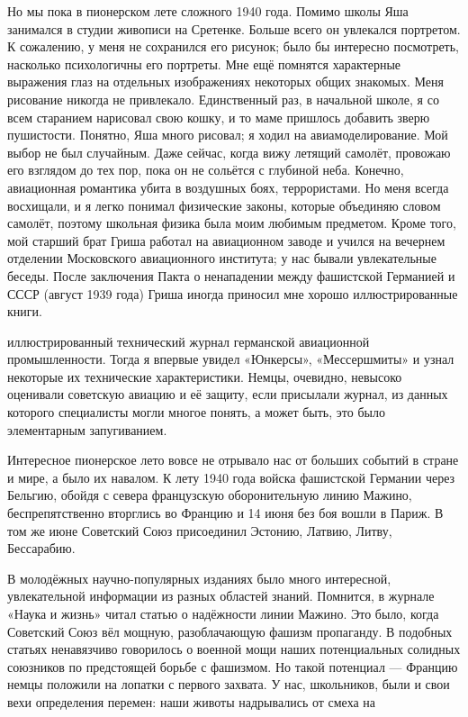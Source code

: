 \label{20-1}
Но мы пока в пионерском лете сложного 1940 года. Помимо школы Яша занимался в студии живописи на Сретенке. Больше всего он увлекался портретом. К сожалению, у меня не сохранился его рисунок; было бы интересно посмотреть, насколько психологичны его портреты. Мне ещё помнятся характерные выражения глаз на отдельных изображениях некоторых общих знакомых. Меня рисование никогда не привлекало. Единственный раз, в начальной школе, я со всем старанием нарисовал свою кошку, и то маме пришлось добавить зверю пушистости. Понятно, Яша много рисовал; я ходил на авиамоделирование. Мой выбор не был случайным. Даже сейчас, когда вижу летящий самолёт, провожаю его взглядом до тех пор, пока он не сольётся с глубиной неба. Конечно, авиационная романтика убита в воздушных боях, террористами. Но меня всегда восхищали, и я легко понимал физические законы, которые объединяю словом самолёт, поэтому школьная физика была моим любимым предметом. Кроме того, мой старший брат Гриша работал на авиационном заводе и учился на вечернем отделении Московского авиационного института; у нас бывали увлекательные беседы. После заключения Пакта о ненападении между фашистской Германией и СССР (август 1939 года) Гриша иногда приносил мне хорошо иллюстрированные книги.

\label{21-1}
иллюстрированный технический журнал германской авиационной промышленности. Тогда я впервые увидел «Юнкерсы», «Мессершмиты» и узнал некоторые их технические характеристики. Немцы, очевидно, невысоко оценивали советскую авиацию и её защиту, если присылали журнал, из данных которого специалисты могли многое понять, а может быть, это было элементарным запугиванием.

\label{21-2}
Интересное пионерское лето вовсе не отрывало нас от больших событий в стране и мире, а было их навалом. К лету 1940 года войска фашистской Германии через Бельгию, обойдя с севера французскую оборонительную линию Мажино, беспрепятственно вторглись во Францию и 14 июня без боя вошли в Париж. В том же июне Советский Союз присоединил Эстонию, Латвию, Литву, Бессарабию.

\label{21-3}
В молодёжных научно-популярных изданиях было много интересной, увлекательной информации из разных областей знаний. Помнится, в журнале «Наука и жизнь» читал статью о надёжности линии Мажино. Это было, когда Советский Союз вёл мощную, разоблачающую фашизм пропаганду. В подобных статьях ненавязчиво говорилось о военной мощи наших потенциальных солидных союзников по предстоящей борьбе с фашизмом. Но такой потенциал — Францию немцы положили на лопатки с первого захвата. У нас, школьников, были и свои вехи определения перемен: наши животы надрывались от смеха на 

